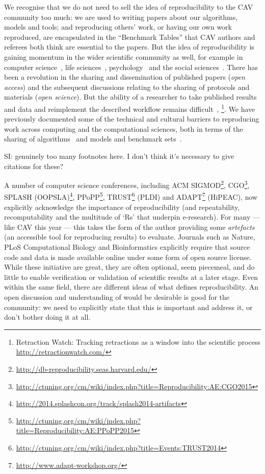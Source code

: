 \documentclass{llncs}
\begin{document}
We recognise that we do not need to sell the idea of reproducibility
to the CAV community too much: we are used to writing papers about our
algorithms, models and tools; and reproducing others' work, or having
our own work reproduced, are encapsulated in the ``Benchmark Tables''
that CAV authors and referees both think are essential to the
papers. But the idea of reproducibility is gaining momentum in the wider
scientific community as well, for example in computer
science~\cite{collberg-et-al:2014}, life
sciences~\cite{rollins-et-al:2014},
psychology~\cite{chambers-et-al:2014} and the social
sciences~\cite{conte-et-al:2012}.  There has been a revolution in the
sharing and dissemination of published papers (\emph{open access}) and
the subsequent discussions relating to the sharing of protocols and
materials (\emph{open science}). But the ability of a researcher to
take published results and data and reimplement the described workflow
remains
difficult~\cite{stodden-et-al:2013,sandve-et-al:2013,wilson-et-al:2014},
\footnote{Retraction Watch: Tracking retractions as a window into the
scientific process\\\url{http://retractionwatch.com/}}.  
We have
previously documented some of the technical and cultural barriers to
reproducing work across computing and the computational sciences, both
in terms of the sharing of algorithms~\cite{crick-et-al_recomp2014}
and models and benchmark sets~\cite{crick-et-al_wssspe2}.

SI: genuinely too many footnotes here. I don't think it's necessary to give citations for these? 

A number of computer science conferences, including ACM
SIGMOD\footnote{\url{http://db-reproducibility.seas.harvard.edu/}},
CGO\footnote{\url{http://ctuning.org/cm/wiki/index.php?title=Reproducibility:AE:CGO2015}},
SPLASH
(OOPSLA)\footnote{\url{http://2014.splashcon.org/track/splash2014-artifacts}},
PPoPP\footnote{\url{http://ctuning.org/cm/wiki/index.php?title=Reproducibility:AE:PPoPP2015}},
TRUST\footnote{\url{http://ctuning.org/cm/wiki/index.php?title=Events:TRUST2014}}
(PLDI) and ADAPT\footnote{\url{http://www.adapt-workshop.org/}}
(HiPEAC), now explicitly acknowledge the importance of reproducibility
(and repeatability, recomputability and the multitude of `Rs' that
underpin e-research).  For many --- like CAV this year --- this takes
the form of the author providing some \emph{artefacts} (an accessible
tool for reproducing results) to evaluate. Journals such as Nature,
PLoS Computational Biology and Bioinformatics explicitly require that
source code and data is made available online under some form of open
source license. While these initiative are great, they are often
optional, seem piecemeal, and do little to enable verification or
validation of scientific results at a later stage. Even within the
same field, there are different ideas of what defines
reproducibility. An open discussion and understanding of would be
desirable is good for the community: we need to explicitly state that
this is important and address it, or don't bother doing it at all.
\end{document}
